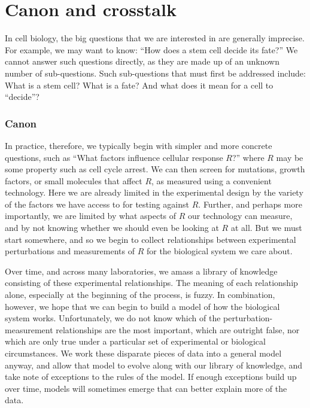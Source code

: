 \section{Canon and crosstalk}
\label{introduction:canon}

In cell biology, the big questions that we are interested in are generally imprecise.
For example, we may want to know: ``How does a
stem cell decide its fate?'' We cannot answer such questions directly, as they
are made up of an unknown number of sub-questions.
Such sub-questions that must first be addressed
include: What is a stem cell? What is a fate? And what does it
mean for a cell to ``decide''?

\subsubsection{Canon}

In practice, therefore, we typically begin with simpler and more
concrete questions, such as ``What factors influence cellular response $R$?''
where $R$ may be some property such as cell cycle arrest.
We can then screen for mutations, growth factors, or small molecules
that affect $R$, as measured using a convenient technology.
Here we are already limited in the experimental design by the variety
of the factors we have access to for testing against $R$. Further,
and perhaps more importantly, we are limited by what aspects of $R$
our technology can measure, and by not knowing whether we should even be
looking at $R$ at all.
But we must start somewhere, and so we begin to collect relationships
between experimental perturbations and measurements of $R$ for the
biological system we care about.


Over time, and across many laboratories,
we amass a library of knowledge consisting of
these experimental relationships. The meaning of each relationship alone, especially
at the beginning of the process, is fuzzy. In combination, however,
we hope that we can begin to build a model of how the biological system
works. Unfortunately, we do not know which of the perturbation-measurement
relationships are the most important, which are outright false, nor
which are only true under a particular set of experimental or biological
circumstances. We
work these disparate pieces of data into a general model
anyway, and allow that model to evolve along with our library of
knowledge, and take note of exceptions to the rules of the model. If enough
exceptions build up over time, models will sometimes emerge that can
better explain more of the data.


